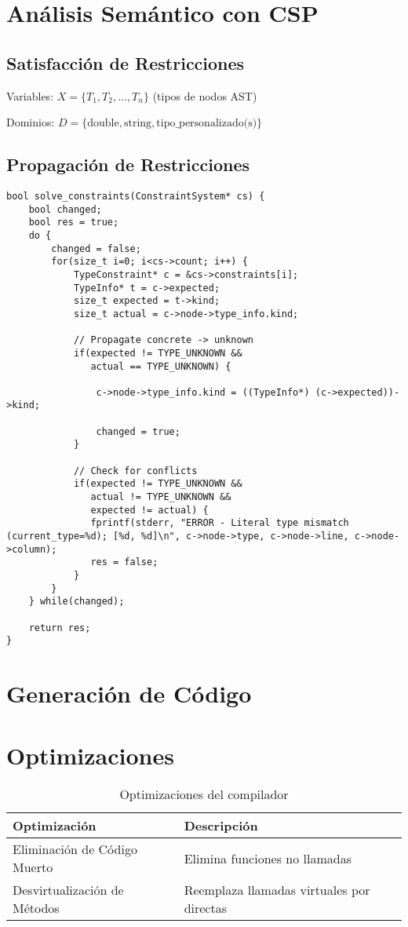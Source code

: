 \documentclass[11pt]{article}
\begin{document}
\section{Análisis Semántico con CSP}
\subsection{Satisfacción de Restricciones}
Variables: $X = \{T_1, T_2, \ldots, T_n\}$ (tipos de nodos AST)

Dominios: $D = \{\text{double}, \text{string}, \text{tipo\_personalizado(s)}\}$

\subsection{Propagación de Restricciones}
\begin{lstlisting}
bool solve_constraints(ConstraintSystem* cs) {
    bool changed;
    bool res = true;
    do {
        changed = false;
        for(size_t i=0; i<cs->count; i++) {
            TypeConstraint* c = &cs->constraints[i];
            TypeInfo* t = c->expected;
            size_t expected = t->kind;
            size_t actual = c->node->type_info.kind;

            // Propagate concrete -> unknown
            if(expected != TYPE_UNKNOWN &&
               actual == TYPE_UNKNOWN) {

                c->node->type_info.kind = ((TypeInfo*) (c->expected))->kind;

                changed = true;
            }

            // Check for conflicts
            if(expected != TYPE_UNKNOWN &&
               actual != TYPE_UNKNOWN &&
               expected != actual) {
               fprintf(stderr, "ERROR - Literal type mismatch (current_type=%d); [%d, %d]\n", c->node->type, c->node->line, c->node->column);
               res = false;
            }
        }
    } while(changed);

    return res;
}
\end{lstlisting}

\section{Generación de Código}

\section{Optimizaciones}
\begin{table}[h]
\centering
\begin{tabularx}{\textwidth}{|l|X|}
\hline
\textbf{Optimización} & \textbf{Descripción} \\
\hline
Eliminación de Código Muerto & Elimina funciones no llamadas \\
Desvirtualización de Métodos & Reemplaza llamadas virtuales por directas \\
\hline
\end{tabularx}
\caption{Optimizaciones del compilador}
\end{table}
\end{document}

